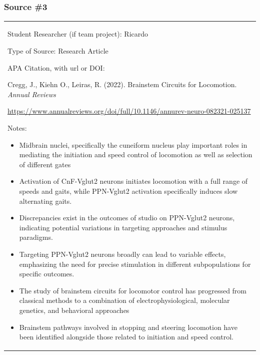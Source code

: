 \subsection{\texorpdfstring{\hfill\break
}{ }}\label{section-2}

\subsubsection{\texorpdfstring{\textbf{Source
\#3}}{Source \#3}}\label{source-3}

\begin{longtable}[]{@{}
  >{\raggedright\arraybackslash}p{}@{}}
\toprule\noalign{}

Student Researcher (if team project): Ricardo


Type of Source: Research Article


APA Citation, with url or DOI:

Cregg, J., Kiehn O., Leiras, R. (2022). Brainstem Circuits for
Locomotion. \emph{Annual Reviews}

\href{https://www.annualreviews.org/doi/full/10.1146/annurev-neuro-082321-025137}{https://www.annualreviews.org/doi/full/10.1146/annurev-neuro-082321-025137}


Notes:

\begin{itemize}
\item
  Midbrain nuclei, specifically the cuneiform nucleus play important
  roles in mediating the initiation and speed control of locomotion as
  well as selection of different gates
\item
  Activation of CnF-Vglut2 neurons initiates locomotion with a full
  range of speeds and gaits, while PPN-Vglut2 activation specifically
  induces slow alternating gaits.
\item
  Discrepancies exist in the outcomes of studio on PPN-Vglut2 neurons,
  indicating potential variations in targeting approaches and stimulus
  paradigms.
\item
  Targeting PPN-Vglut2 neurons broadly can lead to variable effects,
  emphasizing the need for precise stimulation in different
  subpopulations for specific outcomes.
\item
  The study of brainstem circuits for locomotor control has progressed
  from classical methods to a combination of electrophysiological,
  molecular genetics, and behavioral approaches
\item
  Brainstem pathways involved in stopping and steering locomotion have
  been identified alongside those related to initiation and speed
  control.
\end{itemize}



\end{longtable}

